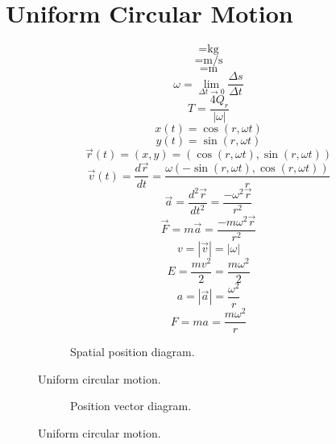 \documentclass[a4paper,12pt]{report}
\begin{document}
\section{Uniform Circular Motion}
\begin{equation}
[m] = \text{kg}
\end{equation}
\begin{equation}
[\omega] = \text{m/s}
\end{equation}
\begin{equation}
[r] = \text{m}
\end{equation}
\begin{equation}
\omega = \lim \limits_{\Delta t \to 0} \frac{\Delta s}{\Delta t}
\end{equation}
\begin{equation}
T = \frac{4Q_r}{|\omega|}
\end{equation}
\begin{equation}
x(t) = \cos(r,\omega t)
\end{equation}
\begin{equation}
y(t) = \sin(r,\omega t)
\end{equation}
\begin{equation}
\vec{r}(t) = (x,y) = (\cos(r,\omega t),\sin(r,\omega t))
\end{equation}
\begin{equation}
\vec{v}(t) = \frac{d \vec{r}}{dt} = \frac{\omega \left(-\sin(r,\omega t),\cos(r,\omega t)\right)}{r}
\end{equation}
\begin{equation}
\vec{a} = \frac{d^2 \vec{r}}{dt^2} = \frac{-\omega^2 \vec{r}}{r^2}
\end{equation}
\begin{equation}
\vec{F} = m \vec{a} = \frac{-m \omega^2 \vec{r}}{r^2}
\end{equation}
\begin{equation}
v = \left|\vec{v}\right| = \left|\omega\right|
\end{equation}
\begin{equation}
E = \frac{mv^2}{2} = \frac{m \omega^2}{2}
\end{equation}
\begin{equation}
a = \left|\vec{a}\right| = \frac{\omega^2}{r}
\end{equation}
\begin{equation}
F = ma = \frac{m \omega^2}{r}
\end{equation}
\clearpage
\begin{figure}[p]
\centering
\begin{subfigure}{\textwidth}
\centering
\resizebox{\textwidth}{!}{}
\caption{Spatial position diagram.}
\end{subfigure}
\caption{Uniform circular motion.}
\end{figure}
\clearpage
\begin{figure}[p]
\centering
\ContinuedFloat
\begin{subfigure}{\textwidth}
\centering
\resizebox{\textwidth}{!}{}
\caption{Position vector diagram.}
\end{subfigure}
\caption{Uniform circular motion.}
\end{figure}
\end{document}

